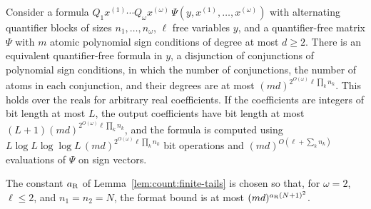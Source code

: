 \begin{theorem}\label{thm:count:renegar}
Consider a formula $Q_1x^{(1)}\cdots Q_\omega x^{(\omega)}\,\Psi(y,x^{(1)},\dots,x^{(\omega)})$
with alternating quantifier blocks of sizes $n_1,\dots,n_\omega$, $\ell$ free
variables $y$, and a quantifier-free matrix $\Psi$ with $m$ atomic polynomial
sign conditions of degree at most $d\ge2$. There is an equivalent
quantifier-free formula in $y$, a disjunction of conjunctions of polynomial
sign conditions, in which the number of conjunctions, the number of atoms in
each conjunction, and their degrees are at most
$(md)^{2^{O(\omega)}\ell\prod_kn_k}$. This holds over the reals for arbitrary
real coefficients. If the coefficients are integers of bit length at most
$L$, the output coefficients have bit length at most
$(L+1)(md)^{2^{O(\omega)}\ell\prod_kn_k}$, and the formula is computed using
$L\log L\log\log L\,(md)^{2^{O(\omega)}\ell\prod_kn_k}$ bit operations and
$(md)^{O(\ell+\sum_kn_k)}$ evaluations of $\Psi$ on sign vectors.
\end{theorem}

The constant $a_{\rm R}$ of Lemma~\ref{lem:count:finite-tails} is chosen so
that, for $\omega=2$, $\ell\le2$, and $n_1=n_2=N$, the format bound is at most
$(md)^{a_{\rm R}(N+1)^2}$.


